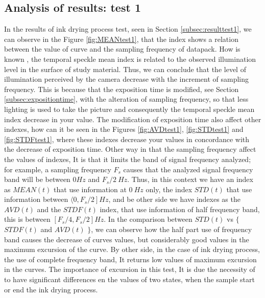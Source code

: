 \documentclass[review]{elsarticle}
\begin{document}
\subsection{Analysis of results: test 1}
\label{subsec:analysistest1}
In the results of ink drying process test, seen in Section \ref{subsec:resulttest1},
we can observe in the Figure \ref{fig:MEANtest1}, that the index shows a relation 
between the value of curve and the sampling frequency of datapack. 
How is known \cite{Nothdurft:05}, the temporal speckle mean index is related to 
the observed illumination level in the surface of study material.
Thus, we can conclude that the level of illumination perceived by the camera decrease
with the increment of sampling frequency. 
This is because that the exposition time is modified, see Section \ref{subsec:expositiontime}, 
with the alteration of sampling frequency, 
so that less lighting is used to take the picture and consequently the 
temporal speckle mean index decrease in  your value.
The modification of exposition time also affect other indexes, 
how can it be seen in the Figures \ref{fig:AVDtest1}, \ref{fig:STDtest1} and  \ref{fig:STDFtest1}, 
where these indexes decrease your values in concordance with the decrease of exposition time.
Other way in that  the sampling frequency affect the values of indexes,
It is that it limits the band of signal frequency analyzed; for example,
a sampling frequency $F_s$ causes that the analyzed signal frequency band will be between $0 Hz$ and $F_s/2~Hz$.
Thus, in this context we have an index as $MEAN(t)$ that use information at  $0~Hz$ only, 
the index $STD(t)$ that use information between $\langle \left. 0, F_s/2 \right ] Hz$, 
and be other side we have indexes as the $AVD(t)$ and the $STDF(t)$ index, that use information of half frequency band, 
this is between $\left [ F_s/4, F_s/2 \right ] Hz$.
In the comparison between $STD(t)$ vs  $\{$ $STDF(t)$ and $AVD(t)$ $\}$, 
we can observe how the half part  use of frequency band causes the decrease of curves values, 
but considerably good values in the maximum excursion of the curve. By other side,
in the case of ink drying process, the use of complete frequency band, 
It returns low values of maximum excursion in the curves. 
The importance of excursion in this test,
 It is due the necessity of to have significant differences en the values of two states,
when the sample start or end the ink drying process.



\end{document}
